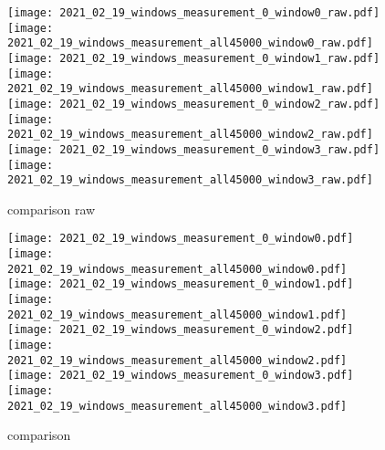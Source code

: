 \begin{figure}[h]
  \centering
  \begin{minipage}{\textwidth}
  \centering
  \texttt{[image: 2021\_02\_19\_windows\_measurement\_0\_window0\_raw.pdf]}
  \texttt{[image: 2021\_02\_19\_windows\_measurement\_all45000\_window0\_raw.pdf]}
  \texttt{[image: 2021\_02\_19\_windows\_measurement\_0\_window1\_raw.pdf]}
  \texttt{[image: 2021\_02\_19\_windows\_measurement\_all45000\_window1\_raw.pdf]}
  \texttt{[image: 2021\_02\_19\_windows\_measurement\_0\_window2\_raw.pdf]}
  \texttt{[image: 2021\_02\_19\_windows\_measurement\_all45000\_window2\_raw.pdf]}
  \texttt{[image: 2021\_02\_19\_windows\_measurement\_0\_window3\_raw.pdf]}
  \texttt{[image: 2021\_02\_19\_windows\_measurement\_all45000\_window3\_raw.pdf]}
  \end{minipage}
  \caption{comparison raw}
  \label{fig:measurement-comparison-raw}
\end{figure}
\begin{figure}[h]
  \centering
  \begin{minipage}{\textwidth}
  \centering
  \texttt{[image: 2021\_02\_19\_windows\_measurement\_0\_window0.pdf]}
  \texttt{[image: 2021\_02\_19\_windows\_measurement\_all45000\_window0.pdf]} \\
  \texttt{[image: 2021\_02\_19\_windows\_measurement\_0\_window1.pdf]}
  \texttt{[image: 2021\_02\_19\_windows\_measurement\_all45000\_window1.pdf]} \\
  \texttt{[image: 2021\_02\_19\_windows\_measurement\_0\_window2.pdf]}
  \texttt{[image: 2021\_02\_19\_windows\_measurement\_all45000\_window2.pdf]} \\
  \texttt{[image: 2021\_02\_19\_windows\_measurement\_0\_window3.pdf]}
  \texttt{[image: 2021\_02\_19\_windows\_measurement\_all45000\_window3.pdf]} 
  \end{minipage}
  \caption{comparison}
  \label{fig:measurement-comparison}
\end{figure}
